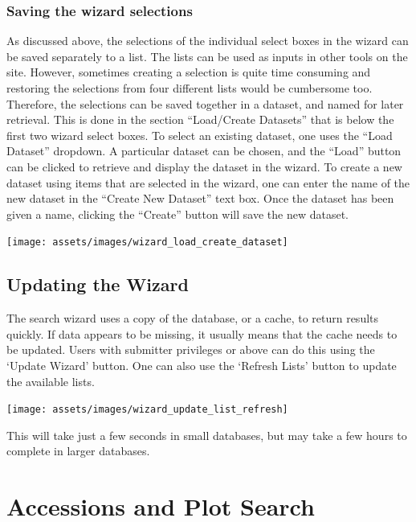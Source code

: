 \documentclass[
  12pt,
]{book}
\begin{document}
\hypertarget{saving-the-wizard-selections}{%
\subsubsection*{Saving the wizard selections}\label{saving-the-wizard-selections}}


As discussed above, the selections of the individual select boxes in the wizard can be saved separately to a list. The lists can be used as inputs in other tools on the site. However, sometimes creating a selection is quite time consuming and restoring the selections from four different lists would be cumbersome too. Therefore, the selections can be saved together in a dataset, and named for later retrieval. This is done in the section ``Load/Create Datasets'' that is below the first two wizard select boxes. To select an existing dataset, one uses the ``Load Dataset'' dropdown. A particular dataset can be chosen, and the ``Load'' button can be clicked to retrieve and display the dataset in the wizard. To create a new dataset using items that are selected in the wizard, one can enter the name of the new dataset in the ``Create New Dataset'' text box. Once the dataset has been given a name, clicking the ``Create'' button will save the new dataset.

\begin{center}\texttt{[image: assets/images/wizard\_load\_create\_dataset]} \end{center}

\hypertarget{updating-the-wizard}{%
\subsection{Updating the Wizard}\label{updating-the-wizard}}

The search wizard uses a copy of the database, or a cache, to return results quickly. If data appears to be missing, it usually means that the cache needs to be updated. Users with submitter privileges or above can do this using the `Update Wizard' button. One can also use the `Refresh Lists' button to update the available lists.

\begin{center}\texttt{[image: assets/images/wizard\_update\_list\_refresh]} \end{center}

This will take just a few seconds in small databases, but may take a few hours to complete in larger databases.

\hypertarget{accessions-and-plot-search}{%
\section{Accessions and Plot Search}\label{accessions-and-plot-search}}
\end{document}
